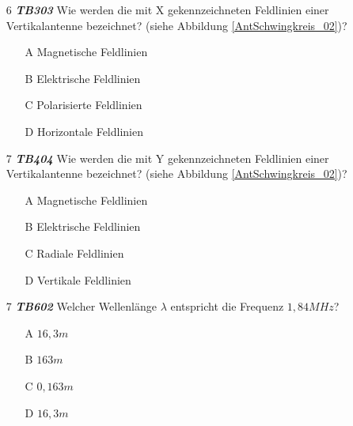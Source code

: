 \begin{enumerate} 
\itemsep1pt\parskip0pt
\item[6] \emph{\textbf{TB303}} Wie werden die mit X gekennzeichneten Feldlinien einer Vertikalantenne bezeichnet? (siehe Abbildung \ref{AntSchwingkreis_02})?
	\begin{enumerate}
	\itemsep1pt\parskip0pt
		\item[A] Magnetische Feldlinien
		\item[B] Elektrische Feldlinien
		\item[C] Polarisierte Feldlinien
		\item[D] Horizontale Feldlinien
	\end{enumerate}
\end{enumerate}


\begin{enumerate} 
\itemsep1pt\parskip0pt
\item[7] \emph{\textbf{TB404}} Wie werden die mit Y gekennzeichneten Feldlinien einer Vertikalantenne bezeichnet? (siehe Abbildung \ref{AntSchwingkreis_02})?
	\begin{enumerate}
	\itemsep1pt\parskip0pt
		\item[A] Magnetische Feldlinien
		\item[B] Elektrische Feldlinien
		\item[C] Radiale Feldlinien
		\item[D] Vertikale Feldlinien
	\end{enumerate}
\end{enumerate}

\begin{enumerate} 
\itemsep1pt\parskip0pt
\item[7] \emph{\textbf{TB602}} Welcher Wellenlänge $\lambda$ entspricht die Frequenz $1,84 MHz$?
	\begin{enumerate}
	\itemsep1pt\parskip0pt
		\item[A] $16,3m$
		\item[B] $163m$
		\item[C] $0,163m$
		\item[D] $16,3m$
	\end{enumerate}
\end{enumerate}
